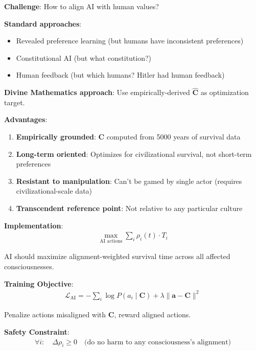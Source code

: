 \documentclass[11pt,a4paper]{article}
\theoremstyle{definition}
\theoremstyle{remark}
\begin{document}
\begin{enumerate}
\begin{protocol}
\textbf{Challenge}: How to align AI with human values?

\textbf{Standard approaches}:
\begin{itemize}
    \item Revealed preference learning (but humans have inconsistent preferences)
    \item Constitutional AI (but what constitution?)
    \item Human feedback (but which humans? Hitler had human feedback)
\end{itemize}

\textbf{Divine Mathematics approach}: Use empirically-derived \(\hat{\mathbf{C}}\) as optimization target.

\textbf{Advantages}:
\begin{enumerate}
    \item \textbf{Empirically grounded}: \(\mathbf{C}\) computed from 5000 years of survival data
    \item \textbf{Long-term oriented}: Optimizes for civilizational survival, not short-term preferences
    \item \textbf{Resistant to manipulation}: Can't be gamed by single actor (requires civilizational-scale data)
    \item \textbf{Transcendent reference point}: Not relative to any particular culture
\end{enumerate}

\textbf{Implementation}:
\begin{align}
\max_{\text{AI actions}} \sum_i \rho_i(t) \cdot T_i
\end{align}

AI should maximize alignment-weighted survival time across all affected consciousnesses.

\textbf{Training Objective}:
\begin{align}
\mathcal{L}_{\text{AI}} = -\sum_i \log P(a_i \mid \mathbf{C}) + \lambda \|\mathbf{a} - \mathbf{C}\|^2
\end{align}

Penalize actions misaligned with \(\mathbf{C}\), reward aligned actions.

\textbf{Safety Constraint}:
\begin{align}
\forall i: \quad \Delta \rho_i \geq 0 \quad \text{(do no harm to any consciousness's alignment)}
\end{align}
\end{protocol}


\end{enumerate}
\end{document}
